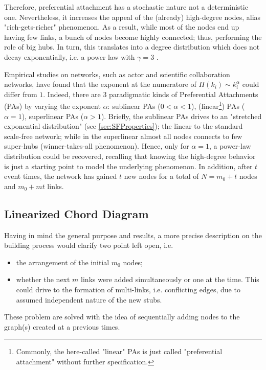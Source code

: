 \documentclass[a4paper,10pt,twoside]{book} %
\theoremstyle{definition}
\begin{document}
Therefore, preferential attachment has a stochastic nature not a deterministic one. Nevertheless, it increases the appeal of the (already) high-degree nodes, alias \label{cit:S.Sagone} "rich-gets-richer" phenomenon. As a result, while most of the nodes end up having few links, a bunch of nodes become highly connected; thus, performing the role of big hubs. In turn, this translates into a degree distribution which does not decay exponentially, i.e. a power law with $\gamma = 3$ \cite{barabasi::2016networkbook}. 

Empirical studies on networks, such as actor and scientific collaboration networks, have found that the exponent at the numeratore of $\Pi(k_i) \sim k_i^\alpha$ could differ from $1$.
Indeed, there are $3$ paradigmatic kinds of Preferential Attachments (PAs) by varying the exponent $\alpha$: sublinear PAs ($0<\alpha<1$), (linear\footnote{Commonly, the here-called "linear" PAs is just called "preferential attachment" without further specification.}) PAs ($\alpha = 1$), superlinear PAs ($\alpha>1$). Briefly, the sublinear PAs drives to an "stretched exponential distribution" (see \autoref{sec:SFProperties}); the linear to the standard scale-free network; while in the superlinear almost all nodes connects to few super-hubs (winner-takes-all phenomenon).
Hence, only for $\alpha = 1$, a power-law distribution could be recovered, recalling that knowing the high-degree behavior is just a starting point to model the underlying phenomenon. 
In addition, after $t$ event times, the network has gained $t$ new nodes for a total of $N = m_0 + t$ nodes and $m_0 + mt$ links.

\newpage
\subsection{Linearized Chord Diagram}
Having in mind the general purpose and results, a more precise description on the building process would clarify two point left open, i.e. 
\begin{itemize}
	\item the arrangement of the initial $m_0$ nodes;
	\item whether the next $m$ links were added simultaneously or one at the time. This could drive to the formation of multi-links, i.e. conflicting edges, due to assumed independent nature of the new stubs. 
\end{itemize}

These problem are solved with the idea of sequentially adding nodes to the graph(s) created at a previous times.
\end{document}
